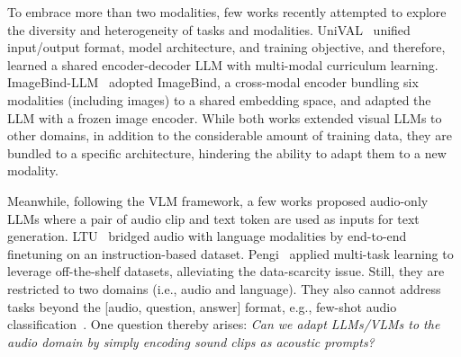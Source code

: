 To embrace more than two modalities, few works recently attempted to explore the diversity and heterogeneity of tasks and modalities. UniVAL~\citep{shukor_unified_2023} unified input/output format, model architecture, and training objective, and therefore, learned a shared encoder-decoder LLM with multi-modal curriculum learning. ImageBind-LLM~\citep{han_imagebind-llm_2023} adopted ImageBind, a cross-modal encoder bundling six modalities (including images) to a shared embedding space, and adapted the LLM with a frozen image encoder. While both works extended visual LLMs to other domains, in addition to the considerable amount of training data, they are bundled to a specific architecture, hindering the ability to adapt them to a new modality.

Meanwhile, following the VLM framework, a few works proposed audio-only LLMs where a pair of audio clip and text token are used as inputs for text generation. LTU~\citep{gong_listen_2023} bridged audio with language modalities by end-to-end finetuning on an instruction-based dataset. Pengi~\citep{deshmukh_pengi_2023} applied multi-task learning to leverage off-the-shelf datasets, alleviating the data-scarcity issue. Still, they are restricted to two domains (i.e., audio and language). They also cannot address tasks beyond the [audio, question, answer] format, e.g., few-shot audio classification~\citep{liang_adapting_2023}. One question thereby arises: \textit{Can we adapt LLMs/VLMs to the audio domain by simply encoding sound clips as acoustic prompts?}

